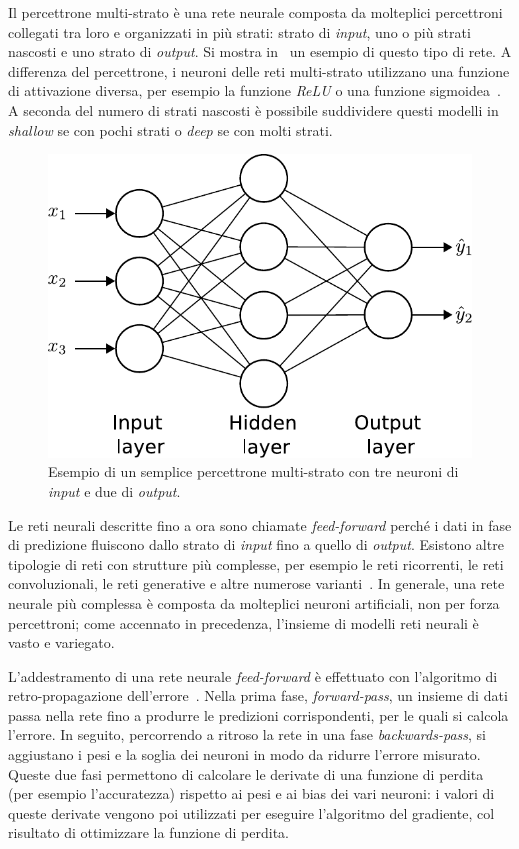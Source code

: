 Il percettrone multi-strato è una rete neurale composta da molteplici percettroni collegati tra loro e organizzati in più strati: strato di \emph{input}, uno o più strati nascosti e uno strato di \emph{output}. Si mostra in~ un esempio di questo tipo di rete. 
A differenza del percettrone, i neuroni delle reti multi-strato utilizzano una funzione di attivazione 
diversa, per esempio la funzione \emph{ReLU} o una funzione sigmoidea~\cite{neural_networks}.
A seconda del numero di strati nascosti è possibile suddividere questi modelli in \emph{shallow} se con pochi strati o \emph{deep} se con molti strati.
\begin{figure}
    \centering
    \includegraphics[width=0.5\linewidth]{img/nn.pdf}
    \caption[Esempio percettrone multi-strato.]{Esempio di un semplice percettrone multi-strato con tre neuroni di \emph{input} e due di \emph{output}.}
    \label{fig:NN}
\end{figure}
Le reti neurali descritte fino a ora sono chiamate \emph{feed-forward} perché i dati in fase di predizione fluiscono dallo strato di \emph{input} fino a quello di \emph{output}.
Esistono altre tipologie di reti con strutture più complesse, per esempio le reti ricorrenti, le reti convoluzionali, le reti generative e altre numerose varianti~\cite{aggarwal2018neural}.
In generale, una rete neurale più complessa è composta da molteplici neuroni artificiali, non per forza percettroni; come accennato in precedenza, l'insieme di modelli reti neurali è vasto e variegato.

L'addestramento di una rete neurale \emph{feed-forward} è effettuato con l'algoritmo di retro-propagazione dell'errore~\cite{neural_networks}.
Nella prima fase, \emph{forward-pass}, un insieme di dati passa nella rete fino a produrre le predizioni corrispondenti, per le quali si calcola l'errore. In seguito, percorrendo a ritroso la rete in una fase \emph{backwards-pass}, si aggiustano i pesi e la soglia dei neuroni in modo da ridurre l'errore misurato.
Queste due fasi permettono di calcolare le derivate di una funzione di perdita (per esempio l'accuratezza) rispetto ai pesi e ai bias dei vari neuroni: i valori di queste derivate vengono poi utilizzati per eseguire l'algoritmo del gradiente, col risultato di ottimizzare la funzione di perdita.

